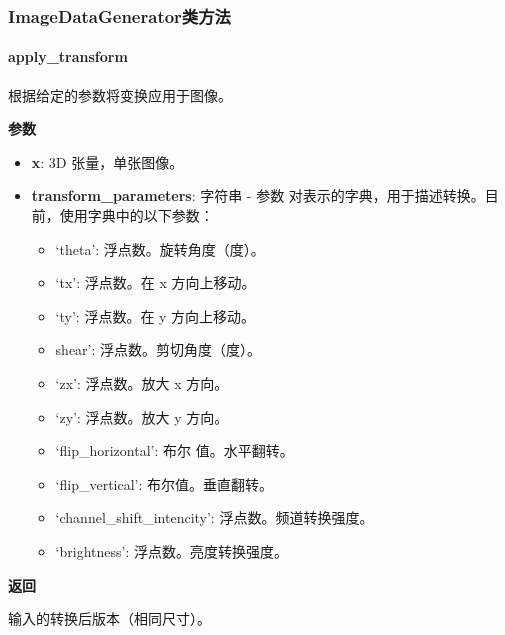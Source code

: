 \hypertarget{imagedatagenerator-ux7c7bux65b9ux6cd5}{%
\subsubsection{ImageDataGenerator类方法}\label{imagedatagenerator-ux7c7bux65b9ux6cd5}}

\hypertarget{apply_transform}{%
\paragraph{apply\_transform}\label{apply_transform}}

\begin{Shaded}
\begin{Highlighting}[]
\end{Highlighting}
\end{Shaded}

根据给定的参数将变换应用于图像。

\textbf{参数}

\begin{itemize}
\tightlist
\item
  \textbf{x}: 3D 张量，单张图像。
\item
  \textbf{transform\_parameters}: 字符串 - 参数
  对表示的字典，用于描述转换。目前，使用字典中的以下参数：

  \begin{itemize}
  \tightlist
  \item
    `theta': 浮点数。旋转角度（度）。
  \item
    `tx': 浮点数。在 x 方向上移动。
  \item
    `ty': 浮点数。在 y 方向上移动。
  \item
    shear': 浮点数。剪切角度（度）。
  \item
    `zx': 浮点数。放大 x 方向。
  \item
    `zy': 浮点数。放大 y 方向。
  \item
    `flip\_horizontal': 布尔 值。水平翻转。
  \item
    `flip\_vertical': 布尔值。垂直翻转。
  \item
    `channel\_shift\_intencity': 浮点数。频道转换强度。
  \item
    `brightness': 浮点数。亮度转换强度。
  \end{itemize}
\end{itemize}

\textbf{返回}

输入的转换后版本（相同尺寸）。


